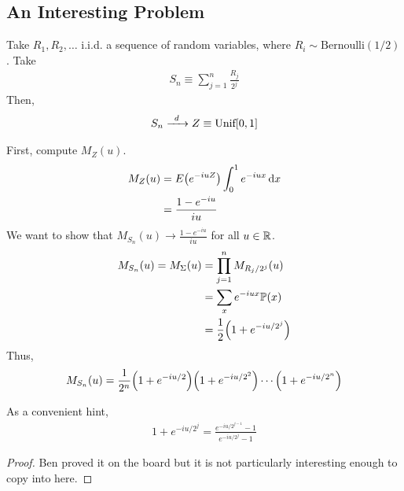 \subsection{An Interesting Problem}
\begin{proposition}
    Take $R_1, R_2, \ldots$ i.i.d. a sequence of random variables, where $R_i \sim \text{Bernoulli}(1/2)$. Take
    \begin{align}
        S_n \equiv \sum_{j=1}^n \frac{R_j}{2^j}
    \end{align}
    Then, 
    \begin{align}
        S_n \ce{->[$d$]} Z \equiv \text{Unif}[0,1]
    \end{align}
\end{proposition}
\begin{solution}
    First, compute $M_Z(u)$.
    \begin{align}
        M_Z(u) &= E\qty(e^{-iuZ}) \int_{0}^1 e^{-iux} \dd{x}\\
        &= \frac{1 - e^{-iu}}{iu}
    \end{align}
    We want to show that $M_{S_n}(u) \longrightarrow \frac{1 - e^{-iu}}{iu}$ for all $u \in \mathbb{R}$.
    \begin{align}
        M_{S_n}(u) = M_{\Sigma}(u) &= \prod_{j=1}^n M_{R_j/2^j}(u)\\
        &= \sum_x e^{-iux} \mathbb{P}(x)\\
        &= \frac{1}{2}\qty(1 + e^{-iu/2^j})
    \end{align}
    Thus,
    \begin{align}
        M_{S_n}(u) = \frac{1}{2^n} \qty(1 + e^{-iu/2}) \qty(1 + e^{-iu/2^2}) \cdots \qty(1 + e^{-iu/2^n})
    \end{align}

    \begin{lemma}
        As a convenient hint,
        \begin{align}
            1 + e^{-iu/2^j} = \frac{e^{-iu/2^{j-1}} - 1}{e^{-iu/2^j} - 1}
        \end{align}
        \begin{proof}
            Ben proved it on the board but it is not particularly interesting enough to copy into here.
        \end{proof}
    \end{lemma}


\end{solution}
